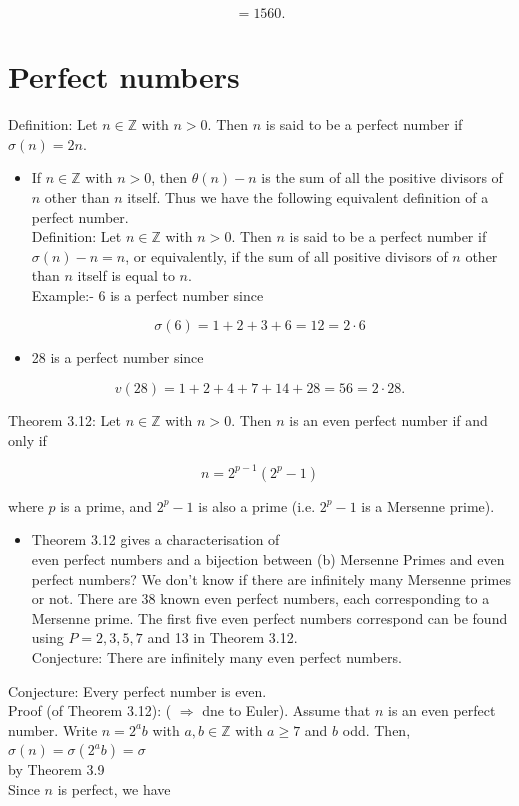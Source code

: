 \documentclass[10pt]{article}
\begin{document}
$$
=1560 .
$$

\section*{Perfect numbers}
Definition: Let $n \in \mathbb{Z}$ with $n>0$. Then $n$ is said to be a perfect number if $\sigma(n)=2 n$.

\begin{itemize}
  \item If $n \in \mathbb{Z}$ with $n>0$, then $\theta(n)-n$ is the sum of all the positive divisors of $n$ other than $n$ itself. Thus we have the following equivalent definition of a perfect number.\\
Definition: Let $n \in \mathbb{Z}$ with $n>0$. Then $n$ is said to be a perfect number if $\sigma(n)-n=n$, or equivalently, if the sum of all positive divisors of $n$ other than $n$ itself is equal to $n$.\\
Example:- 6 is a perfect number since
\end{itemize}

$$
\sigma(6)=1+2+3+6=12=2 \cdot 6
$$

\begin{itemize}
  \item 28 is a perfect number since
\end{itemize}

$$
v(28)=1+2+4+7+14+28=56=2 \cdot 28 .
$$

Theorem 3.12: Let $n \in \mathbb{Z}$ with $n>0$. Then $n$ is an even perfect number if and only if

$$
n=2^{p-1}\left(2^{p}-1\right)
$$

where $p$ is a prime, and $2^{p}-1$ is also a prime (i.e. $2^{p}-1$ is a Mersenne prime).

\begin{itemize}
  \item Theorem 3.12 gives a characterisation of\\
even perfect numbers and a bijection between (b) Mersenne Primes and even perfect numbers? We don't know if there are infinitely many Mersenne primes or not. There are 38 known even perfect numbers, each corresponding to a Mersenne prime. The first five even perfect numbers correspond can be found using $P=2,3,5,7$ and 13 in Theorem 3.12.\\
Conjecture: There are infinitely many even perfect numbers.
\end{itemize}

Conjecture: Every perfect number is even.\\
Proof (of Theorem 3.12): ( $\Rightarrow$ dne to Euler). Assume that $n$ is an even perfect number. Write $n=2^{a} b$ with $a, b \in \mathbb{Z}$ with $a \geqslant 7$ and $b$ odd. Then,\\
$\sigma(n)=\sigma\left(2^{a} b\right)=\sigma$\\
by Theorem 3.9\\
Since $n$ is perfect, we have
\end{document}
